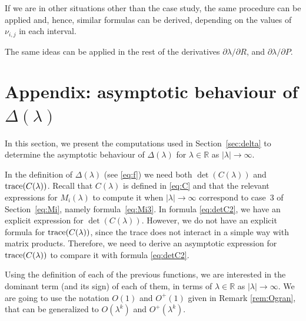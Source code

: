 \documentclass[a4paper]{article}
\newcommand{\X}[3]{#1_{#3,#2}}
\numberwithin{equation}{section}
\begin{document}
 If we are in other situations other than the case study, the same procedure can be applied and, hence, similar formulas can be derived, depending on the values of $\X{\nu}{j}{i}$ in each interval.

The same ideas can be applied in the rest of the derivatives $\partial \lambda/\partial R$, and $\partial \lambda/\partial P$.

\section{Appendix: asymptotic behaviour of $\Delta(\lambda)$}\label{sec:appendix2}
In this section, we present the computations used in Section~\ref{sec:delta} to determine the asymptotic behaviour of $\Delta(\lambda)$ for $\lambda\in\mathbb{R}$ as $|\lambda|\to\infty$.

In the definition of $\Delta(\lambda)$ (see \eqref{eq:f}) we need both $\det(C(\lambda))$ and ${\rm trace}(C(\lambda))$. Recall that $C(\lambda)$ is defined in \eqref{eq:C} and that the relevant expressions for $M_i(\lambda)$ to compute it when $|\lambda|\to\infty$ correspond to case~3 of Section~\ref{eq:Mi}, namely formula~\eqref{eq:Mi3}. In formula \eqref{eq:detC2}, we have an explicit expression for $\det(C(\lambda))$. However, we do not have an explicit formula for ${\rm trace}(C(\lambda))$, since the trace does not interact in a simple way with matrix products. Therefore, we need to derive an asymptotic expression for ${\rm trace}(C(\lambda))$ to compare it with formula \eqref{eq:detC2}.

Using the definition of each of the previous functions, we are interested in the dominant term (and its sign) of each of them, in terms of $\lambda\in\mathbb{R}$ as $|\lambda|\to\infty$. We are going to use the notation $O(1)$ and $O^+(1)$ given in Remark \ref{rem:Ogran}, that can be generalized to $O(\lambda^k)$ and $O^+(\lambda^k)$.
\end{document}
